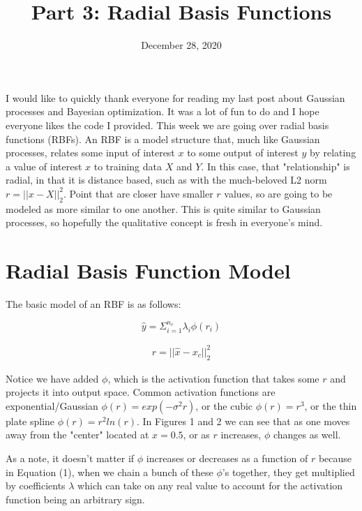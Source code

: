 \documentclass[12pt]{article}
\title{\textbf{Part 3: Radial Basis Functions}}
\begin{document}
\date{December 28, 2020}
\maketitle

I would like to quickly thank everyone for reading my last post about Gaussian processes and Bayesian optimization. It was a lot of fun to do and I hope everyone likes the code I provided. This week we are going over radial basis functions (RBFs). An RBF is a model structure that, much like Gaussian processes, relates some input of interest $x$ to some output of interest $y$ by relating a value of interest $x$ to training data $X$ and $Y$. In this case, that "relationship" is radial, in that it is distance based, such as with the much-beloved L2 norm $r=||x-X||_2^2$. Point that are closer have smaller $r$ values, so are going to be modeled as more similar to one another. This is quite similar to Gaussian processes, so hopefully the qualitative concept is fresh in everyone's mind.

\section{Radial Basis Function Model}

The basic model of an RBF is as follows:

\begin{equation}
\hat{y}=\Sigma_{i=1}^{n_c} \lambda_i \phi(r_i)
\end{equation}

\begin{align*}
r=||\hat{x}-x_c||_2^2
\end{align*}

Notice we have added $\phi$, which is the activation function that takes some $r$ and projects it into output space. Common activation functions are exponential/Gaussian $\phi(r)=exp(-\sigma^2 r)$, or the cubic $\phi(r)=r^3$, or the thin plate spline $\phi(r)=r^2 ln(r)$. In Figures 1 and 2 we can see that as one moves away from the "center" located at $x=0.5$, or as $r$ increases, $\phi$ changes as well. 

\vspace{5mm}

As a note, it doesn't matter if $\phi$ increases or decreases as a function of $r$ because in Equation (1), when we chain a bunch of these $\phi$'s together, they get multiplied by coefficients $\lambda$ which can take on any real value to account for the activation function being an arbitrary sign.
\end{document}
